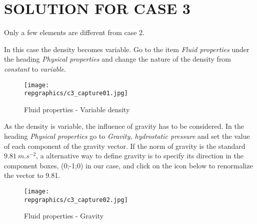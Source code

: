 %
%
%
%
%
%
%
\section{SOLUTION FOR CASE 3}

Only a few elements are different from case 2.

In this case the density becomes variable. Go to the item
{\itshape Fluid properties} under the heading
{\itshape Physical properties} and change the nature of the density from
{\itshape constant} to {\itshape variable}.

\begin{figure}[h!]
\begin{center}
\texttt{[image: \\repgraphics/c3\_capture01.jpg]}
\caption{Fluid properties - Variable density}
\label{fig1_e3}
\end{center}
\end{figure}


\newpage
As the density is variable, the influence of gravity has to be considered. In the
heading {\itshape Physical properties} go to
{\itshape Gravity, hydrostatic pressure} and set the value of each component of
the gravity vector. If the norm of gravity is the standard $9.81\ m.s^{-2}$, a
alternative way to define gravity is to specify its direction in the component
boxes, (0;-1;0) in our case, and click on the icon below to renormalize the
vector to 9.81.

\begin{figure}[h!]
\begin{center}
\texttt{[image: \\repgraphics/c3\_capture02.jpg]}
\caption{Fluid properties - Gravity}
\label{fig2_e3}
\end{center}
\end{figure}


